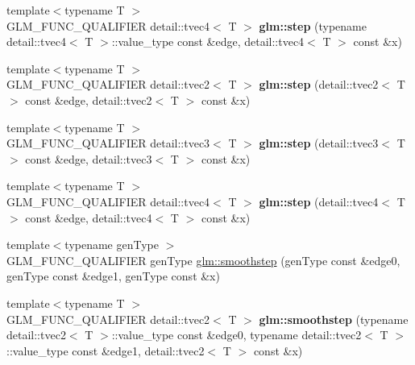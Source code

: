 \begin{DoxyCompactItemize}
\item 
\hypertarget{namespaceglm_a5b8d769e10531d75d560d533c4a2e9d2}{}{\footnotesize template$<$typename T $>$ }\\G\+L\+M\+\_\+\+F\+U\+N\+C\+\_\+\+Q\+U\+A\+L\+I\+F\+I\+E\+R detail\+::tvec4$<$ T $>$ {\bfseries glm\+::step} (typename detail\+::tvec4$<$ T $>$\+::value\+\_\+type const \&edge, detail\+::tvec4$<$ T $>$ const \&x)\label{namespaceglm_a5b8d769e10531d75d560d533c4a2e9d2}

\item 
\hypertarget{namespaceglm_ada537586e2c341cbdd3e4a213b03a2da}{}{\footnotesize template$<$typename T $>$ }\\G\+L\+M\+\_\+\+F\+U\+N\+C\+\_\+\+Q\+U\+A\+L\+I\+F\+I\+E\+R detail\+::tvec2$<$ T $>$ {\bfseries glm\+::step} (detail\+::tvec2$<$ T $>$ const \&edge, detail\+::tvec2$<$ T $>$ const \&x)\label{namespaceglm_ada537586e2c341cbdd3e4a213b03a2da}

\item 
\hypertarget{namespaceglm_afc1e0844aecc410c1ab7204423ea81f3}{}{\footnotesize template$<$typename T $>$ }\\G\+L\+M\+\_\+\+F\+U\+N\+C\+\_\+\+Q\+U\+A\+L\+I\+F\+I\+E\+R detail\+::tvec3$<$ T $>$ {\bfseries glm\+::step} (detail\+::tvec3$<$ T $>$ const \&edge, detail\+::tvec3$<$ T $>$ const \&x)\label{namespaceglm_afc1e0844aecc410c1ab7204423ea81f3}

\item 
\hypertarget{namespaceglm_a473ace2b49062e6f5a5203697a7d369d}{}{\footnotesize template$<$typename T $>$ }\\G\+L\+M\+\_\+\+F\+U\+N\+C\+\_\+\+Q\+U\+A\+L\+I\+F\+I\+E\+R detail\+::tvec4$<$ T $>$ {\bfseries glm\+::step} (detail\+::tvec4$<$ T $>$ const \&edge, detail\+::tvec4$<$ T $>$ const \&x)\label{namespaceglm_a473ace2b49062e6f5a5203697a7d369d}

\item 
{\footnotesize template$<$typename gen\+Type $>$ }\\G\+L\+M\+\_\+\+F\+U\+N\+C\+\_\+\+Q\+U\+A\+L\+I\+F\+I\+E\+R gen\+Type \hyperlink{group__core__func__common_ga754103c8d2cdaf40f71429252457c10a}{glm\+::smoothstep} (gen\+Type const \&edge0, gen\+Type const \&edge1, gen\+Type const \&x)
\item 
\hypertarget{namespaceglm_a014f47bc1de6cd13bf15da2f52ca298b}{}{\footnotesize template$<$typename T $>$ }\\G\+L\+M\+\_\+\+F\+U\+N\+C\+\_\+\+Q\+U\+A\+L\+I\+F\+I\+E\+R detail\+::tvec2$<$ T $>$ {\bfseries glm\+::smoothstep} (typename detail\+::tvec2$<$ T $>$\+::value\+\_\+type const \&edge0, typename detail\+::tvec2$<$ T $>$\+::value\+\_\+type const \&edge1, detail\+::tvec2$<$ T $>$ const \&x)\label{namespaceglm_a014f47bc1de6cd13bf15da2f52ca298b}


\end{DoxyCompactItemize}
